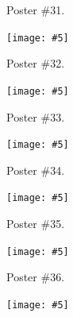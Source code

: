 \documentclass[12pt,oneside]{article}
\newcommand{\embed}[5]{\begin{center}\texttt{[image: \#5]}\end{center}\clearpage}
\newcommand{\onlyposter}[1]{\centerline{\small\noindent Poster \##1.}}
\begin{document}
\onlyposter{31}
\embed{2.5cm}{4cm}{1.5cm}{2.75cm}{6-molgenis.pdf}

\onlyposter{32}
\embed{2.5cm}{12cm}{2.25cm}{2.65cm}{13-SPINGO.pdf}

\onlyposter{33}
\embed{2.5cm}{12cm}{1.8cm}{2.85cm}{51-ANNOgesic.pdf}

\onlyposter{34}
\embed{2.5cm}{3.25cm}{1cm}{2.8cm}{44-bioxsd.pdf}

\onlyposter{35}
\embed{2.5cm}{12cm}{2.25cm}{2.85cm}{60-mgkit.pdf}

\onlyposter{36}
\embed{2.5cm}{2.5cm}{0.25cm}{2.65cm}{64-annot-nf.pdf}

\end{document}
